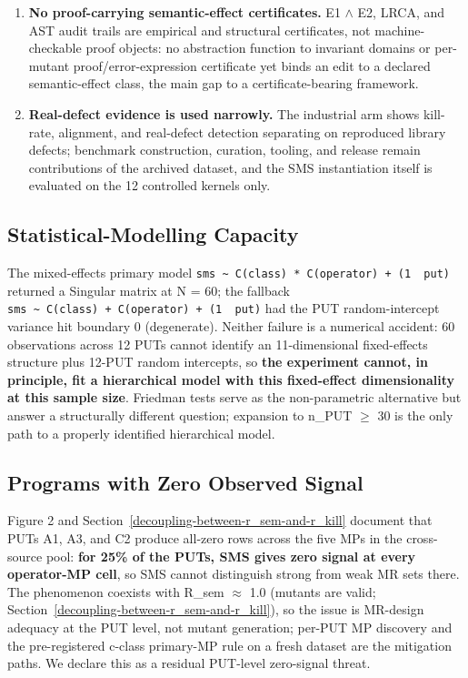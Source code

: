 \documentclass[manuscript,screen,review]{acmart}
\begin{document}
\begin{enumerate}
  pools require LLM access.
\item
  \textbf{No proof-carrying semantic-effect certificates.} E1 $\wedge$ E2, LRCA,
  and AST audit trails are empirical and structural certificates, not
  machine-checkable proof objects: no abstraction function to invariant
  domains or per-mutant proof/error-expression certificate yet binds an edit
  to a declared semantic-effect class, the main gap to a certificate-bearing
  framework.
\item
  \textbf{Real-defect evidence is used narrowly.} The industrial arm shows
  kill-rate, alignment, and real-defect detection separating on reproduced
  library defects; benchmark construction, curation, tooling, and release remain
  contributions of the archived dataset, and the SMS instantiation itself is
  evaluated on the 12 controlled kernels only.
\end{enumerate}

\subsection{Statistical-Modelling Capacity}\label{statistical-modelling-capacity-at-n-60-cells-12-puts}

The mixed-effects primary model
\texttt{sms\ \textasciitilde{}\ C(class)\ *\ C(operator)\ +\ (1\ \textbar{}\ put)}
returned a Singular matrix at N = 60; the fallback
\texttt{sms\ \textasciitilde{}\ C(class)\ +\ C(operator)\ +\ (1\ \textbar{}\ put)}
had the PUT random-intercept variance hit boundary 0 (degenerate). Neither
failure is a numerical accident: 60 observations across 12 PUTs cannot
identify an 11-dimensional fixed-effects structure plus 12-PUT random
intercepts, so \textbf{the experiment cannot, in principle, fit a
hierarchical model with this fixed-effect dimensionality at this sample
size}. Friedman tests serve as the non-parametric alternative but answer a
structurally different question; expansion to n\_PUT $\geq$ 30 is the only
path to a properly identified hierarchical model.

\subsection{Programs with Zero Observed Signal}\label{put-level-zero-mass-cohort}

Figure 2 and Section~\ref{decoupling-between-r_sem-and-r_kill} document that PUTs A1, A3, and C2 produce all-zero
rows across the five MPs in the cross-source pool:
\textbf{for 25\% of the PUTs, SMS gives zero signal at every operator-MP
cell}, so SMS cannot distinguish strong from weak MR sets there. The
phenomenon coexists with R\_sem $\approx$ 1.0 (mutants are valid;
Section~\ref{decoupling-between-r_sem-and-r_kill}), so the issue is
MR-design adequacy at the PUT level, not mutant generation; per-PUT MP
discovery and the pre-registered c-class primary-MP rule on a fresh dataset
are the mitigation paths. We declare this as a residual PUT-level
zero-signal threat.
\end{document}

